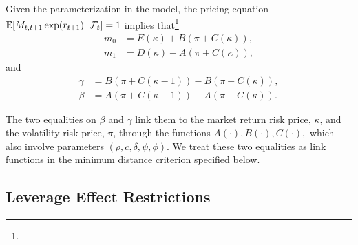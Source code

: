 \begin{lemma}
    \label{Lemma m0 and m1}
    Given the parameterization in the model, the pricing equation \newline $\operatorname{\mathbb{E}}[M_{t,t+1}\exp (r_{t+1}) \,\vert\, \mathcal{F}_{t}]=1$ implies that\footnote{}
%
    \begin{align*}
        m_{0} &= E(\kappa )+B\left( \pi +C\left( \kappa \right) \right) , \\
%
        m_{1} &= D\left( \kappa \right) +A\left( \pi +C\left( \kappa \right) \right) ,
    \end{align*}
    and
%
    \begin{align*}
        \gamma  &= B\left( \pi +C\left( \kappa -1\right) \right) -B\left( \pi +C\left( \kappa \right) \right), \\
        \beta  &= A\left( \pi +C\left( \kappa -1\right) \right) -A\left( \pi +C\left( \kappa \right) \right).
    \end{align*}
\end{lemma}

The two equalities on $\beta $ and $\gamma $ link them to the market return risk price, $\kappa$, and the volatility risk price, $\pi$,  through the functions $A(\cdot),B(\cdot ),C(\cdot ),$ which also involve parameters $(\rho ,c,\delta ,\psi ,\phi ).$ We treat these two equalities as link functions in the minimum distance criterion specified below.

\subsection{Leverage Effect Restrictions}\label{sec:leverage effect restrict}


